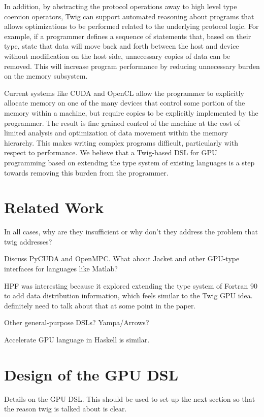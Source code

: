 \documentclass[11pt]{article}
\begin{document}
In addition, by abstracting the protocol operations away to high level type
coercion operators, Twig can support automated reasoning about programs that
allows optimizations to be performed related to the underlying protocol logic.
For example, if a programmer defines a sequence of statements that, based on
their type, state that data will move back and forth between the host and
device without modification on the host side, unnecessary copies of data can
be removed. This will increase program performance by reducing unnecessary
burden on the memory subsystem.

Current systems like CUDA and OpenCL allow the programmer to explicitly
allocate memory on one of the many devices that control some portion of the
memory within a machine, but require copies to be explicitly implemented by
the programmer. The result is fine grained control of the machine at the cost
of limited analysis and optimization of data movement within the memory
hierarchy. This makes writing complex programs difficult, particularly with
respect to performance. We believe that a Twig-based DSL for GPU programming
based on extending the type system of existing languages is a step towards
removing this burden from the programmer.

\section{Related Work}

In all cases, why are they insufficient or why don't they address the problem
that twig addresses?

Discuss PyCUDA and OpenMPC. What about Jacket and other GPU-type interfaces
for languages like Matlab?

HPF was interesting because it explored extending the type system of Fortran
90 to add data distribution information, which feels similar to the Twig GPU
idea. definitely need to talk about that at some point in the paper.

Other general-purpose DSLs? Yampa/Arrows?

Accelerate GPU language in Haskell is similar.  

\section{Design of the GPU DSL}

Details on the GPU DSL.  This should be used to set up the next section so
that the reason twig is talked about is clear.
\end{document}
